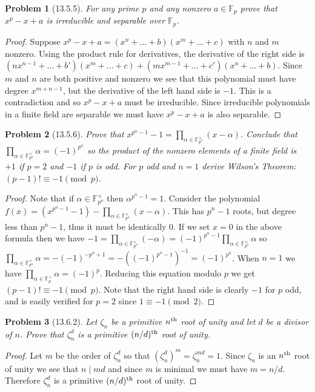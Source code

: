 \documentclass{article}
\newtheorem{problem}{Problem}
\begin{document}
\begin{problem}[13.5.5]
For any prime $p$ and any nonzero $a \in \mathbb{F}_p$ prove that $x^p - x + a$ is irreducible and separable over $\mathbb{F}_p$.
\end{problem}
\begin{proof}
Suppose $x^p - x + a = (x^n + \dots + b)(x^m + \dots + c)$ with $n$ and $m$ nonzero. Using the product rule for derivatives, the derivative of the right side is $(nx^{n-1} + \dots + b')(x^m + \dots + c) + (mx^{m-1} + \dots + c')(x^n + \dots + b)$. Since $m$ and $n$ are both positive and nonzero we see that this polynomial must have degree $x^{m+n-1}$, but the derivative of the left hand side is $-1$. This is a contradiction and so $x^p - x + a$ must be irreducible. Since irreducible polynomials in a finite field are separable we must have $x^p - x + a$ is also separable.
\end{proof}

\begin{problem}[13.5.6]
Prove that $x^{p^n-1} - 1 = \prod_{\alpha \in \mathbb{F}_{p^n}^{\times}} (x - \alpha)$. Conclude that $\prod_{\alpha \in \mathbb{F}_{p^n}^{\times}} \alpha = (-1)^{p^n}$ so the product of the nonzero elements of a finite field is $+1$ if $p = 2$ and $-1$ if $p$ is odd. For $p$ odd and $n = 1$ derive \emph{Wilson's Theorem}: $(p-1)! \equiv -1 \pmod{p}$.
\end{problem}
\begin{proof}
Note that if $\alpha \in \mathbb{F}_{p^n}^{\times}$ then $\alpha^{p^n-1} = 1$. Consider the polynomial $f(x) = (x^{p^n-1} - 1) - \prod_{\alpha \in \mathbb{F}_{p^n}^{\times}} (x - \alpha)$. This has $p^n - 1$ roots, but degree less than $p^n - 1$, thus it must be identically $0$. If we set $x = 0$ in the above formula then we have $-1 = \prod_{\alpha \in \mathbb{F}_{p^n}^{\times}} (- \alpha) = (-1)^{p^n-1} \prod_{\alpha \in \mathbb{F}_{p^n}^{\times}} \alpha$ so $\prod_{\alpha \in \mathbb{F}_{p^n}^{\times}} \alpha = -(-1)^{-p^n+1} = -((-1)^{p^n-1})^{-1} = (-1)^{p^n}$. When $n = 1$ we have $\prod_{\alpha \in \mathbb{F}_p^{\times}} \alpha = (-1)^p$. Reducing this equation modulo $p$ we get $(p-1)! \equiv -1 \pmod{p}$. Note that the right hand side is clearly $-1$ for $p$ odd, and is easily verified for $p = 2$ since $1 \equiv -1 \pmod{2}$.
\end{proof}

\begin{problem}[13.6.2]
Let $\zeta_n$ be a primitive $n^{\textup{th}}$ root of unity and let $d$ be a divisor of $n$. Prove that $\zeta_n^d$ is a primitive $(n/d)^{\textup{th}}$ root of unity.
\end{problem}
\begin{proof}
Let $m$ be the order of $\zeta_n^d$ so that $(\zeta_n^d)^m = \zeta_n^{md} = 1$. Since $\zeta_n$ is an $n^{\textup{th}}$ root of unity we see that $n \mid md$ and since $m$ is minimal we must have $m = n/d$. Therefore $\zeta_n^d$ is a primitive $(n/d)^{\textup{th}}$ root of unity.
\end{proof}
\end{document}
